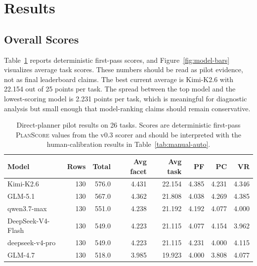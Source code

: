 \documentclass[11pt]{article}
\newcommand{\planscore}{\textsc{PlanScore}}
\begin{document}
  
\section{Results}

\subsection{Overall Scores}

Table~\ref{tab:model-scores} reports deterministic first-pass scores, and Figure~\ref{fig:model-bars} visualizes average task scores. These numbers should be read as pilot evidence, not as final leaderboard claims. The best current average is Kimi-K2.6 with 22.154 out of 25 points per task. The spread between the top model and the lowest-scoring model is 2.231 points per task, which is meaningful for diagnostic analysis but small enough that model-ranking claims should remain conservative.

\begin{table}[t]
\caption{Direct-planner pilot results on 26 tasks. Scores are deterministic first-pass \planscore{} values from the v0.3 scorer and should be interpreted with the human-calibration results in Table~\ref{tab:manual-auto}.}
\label{tab:model-scores}
\centering
\small
\begin{tabular}{lrrrrrrr}
\toprule
\textbf{Model} & \textbf{Rows} & \textbf{Total} & \textbf{Avg facet} & \textbf{Avg task} & \textbf{PF} & \textbf{PC} & \textbf{VR} \\
\midrule
Kimi-K2.6 & 130 & 576.0 & 4.431 & 22.154 & 4.385 & 4.231 & 4.346 \\
GLM-5.1 & 130 & 567.0 & 4.362 & 21.808 & 4.038 & 4.269 & 4.385 \\
qwen3.7-max & 130 & 551.0 & 4.238 & 21.192 & 4.192 & 4.077 & 4.000 \\
DeepSeek-V4-Flash & 130 & 549.0 & 4.223 & 21.115 & 4.077 & 4.154 & 3.962 \\
deepseek-v4-pro & 130 & 549.0 & 4.223 & 21.115 & 4.231 & 4.000 & 4.115 \\
GLM-4.7 & 130 & 518.0 & 3.985 & 19.923 & 4.000 & 3.808 & 4.077 \\
\bottomrule
\end{tabular}
\end{table}
\end{document}
